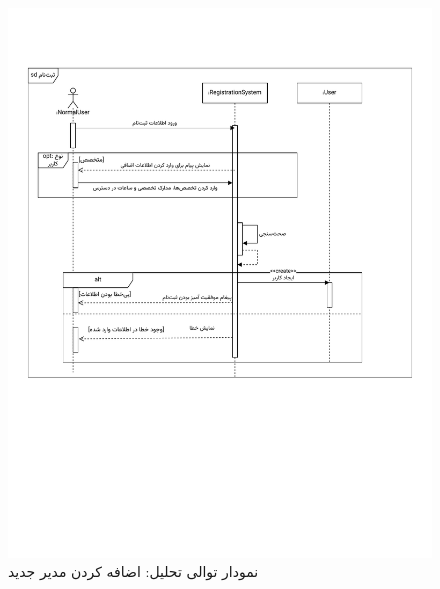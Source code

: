 \begin{figure}[ht!]
	\centering
	\includegraphics[scale=0.8, page=7]{figs/OOD-Sequence-1.pdf}
	\caption{نمودار توالی تحلیل: اضافه کردن مدیر جدید}
\end{figure}
\FloatBarrier
\newpage

